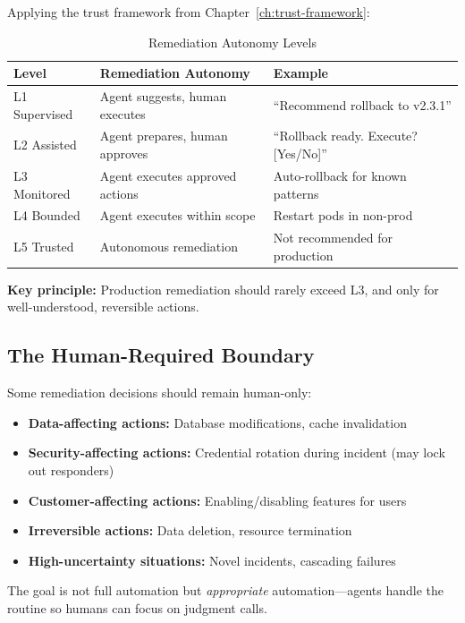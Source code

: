 Applying the trust framework from Chapter~\ref{ch:trust-framework}:

\begin{table}[htbp]
\centering
\caption{Remediation Autonomy Levels}
\label{tab:remediation-autonomy}
\begin{tabular}{lll}
\toprule
\textbf{Level} & \textbf{Remediation Autonomy} & \textbf{Example} \\
\midrule
L1 Supervised & Agent suggests, human executes & ``Recommend rollback to v2.3.1'' \\
L2 Assisted & Agent prepares, human approves & ``Rollback ready. Execute? [Yes/No]'' \\
L3 Monitored & Agent executes approved actions & Auto-rollback for known patterns \\
L4 Bounded & Agent executes within scope & Restart pods in non-prod \\
L5 Trusted & Autonomous remediation & Not recommended for production \\
\bottomrule
\end{tabular}
\end{table}

\textbf{Key principle:} Production remediation should rarely exceed L3, and only for well-understood, reversible actions.

\subsection{The Human-Required Boundary}
\label{subsec:human-required}

Some remediation decisions should remain human-only:

\begin{itemize}
    \item \textbf{Data-affecting actions:} Database modifications, cache invalidation
    \item \textbf{Security-affecting actions:} Credential rotation during incident (may lock out responders)
    \item \textbf{Customer-affecting actions:} Enabling/disabling features for users
    \item \textbf{Irreversible actions:} Data deletion, resource termination
    \item \textbf{High-uncertainty situations:} Novel incidents, cascading failures
\end{itemize}

The goal is not full automation but \textit{appropriate} automation---agents handle the routine so humans can focus on judgment calls.

